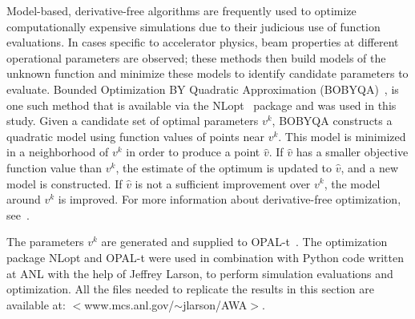 Model-based, derivative-free algorithms are frequently used to optimize
computationally expensive simulations due to their judicious use of function
evaluations. In cases specific to accelerator physics, 
beam properties at different operational parameters are observed;
these methods then build models of the unknown
function and minimize these models to identify candidate parameters to 
evaluate. Bounded Optimization BY Quadratic Approximation (BOBYQA)~\cite{bobyqa},
 is one such method that is available via the
NLopt~\cite{nlopt} package and was used in this study. 
Given a candidate set of optimal parameters $v^k$, BOBYQA
constructs a quadratic model using function values of points near $v^k$. 
This model is minimized in a neighborhood of $v^k$ in order to produce a point $\hat{v}$. 
If $\hat{v}$ has a smaller objective function value than $v^k$, 
the estimate of the optimum is updated to $\hat{v}$, and a new model is constructed. 
If $\hat{v}$ is not a sufficient improvement over $v^k$, 
the model around $v^k$ is improved. For more
information about derivative-free optimization, see~\cite{Conn2009a}.

The parameters $v^k$ are generated and supplied to OPAL-t~\cite{opal}. 
The optimization package NLopt and OPAL-t were used
in combination with Python code written at ANL with the help 
of Jeffrey Larson, to perform simulation evaluations and optimization.
All the files needed to replicate the results in this section are available at: 
$<$www.mcs.anl.gov/$\sim$jlarson/AWA$>$.  

